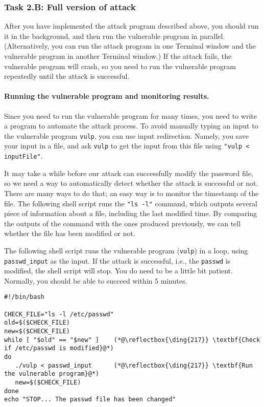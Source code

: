 \subsubsection{Task 2.B: Full version of attack}
After you have implemented the attack program described above, you
should run it in the background, and then run the vulnerable program in
parallel. (Alternatively, you can run the attack program in one Terminal
window and the vulnerable program in another Terminal window.)  If the
attack fails, the vulnerable program will crash, so you need to run the
vulnerable program repeatedly until the attack is successful. 



\paragraph{Running the vulnerable program and monitoring results.}
Since you need to run the vulnerable program for many
times, you need to write a program to automate the attack process. 
To avoid manually typing an input to the vulnerable program \texttt{vulp}, you can use 
input redirection. Namely, you save your input in a file, and ask
\texttt{vulp} to get the input from this file using \texttt{"vulp <
inputFile"}.

It may take a while before our attack can successfully modify the
password file, so we need a way to automatically detect whether the attack is
successful or not. There are many ways to do that; an easy way 
is to monitor the timestamp of the file.
The following shell script runs the \texttt{"ls -l"} command, which
outputs several piece of information about a
file, including the last modified time. By comparing the outputs of the
command with the ones produced previously, we can tell
whether the file has been modified or not. 


The following shell script runs the vulnerable program (\texttt{vulp}) in a loop,
using \texttt{passwd\_input} as the input. If the attack is successful, i.e.,
the \texttt{passwd} is modified, the shell script will stop. 
You do need to be a little bit patient. 
Normally, you should be able to succeed within 5 minutes. 



\begin{lstlisting}
#!/bin/bash

CHECK_FILE="ls -l /etc/passwd"
old=$($CHECK_FILE)
new=$($CHECK_FILE)
while [ "$old" == "$new" ]    (*@\reflectbox{\ding{217}} \textbf{Check if /etc/passwd is modified}@*)
do
   ./vulp < passwd_input      (*@\reflectbox{\ding{217}} \textbf{Run the vulnerable program}@*)
   new=$($CHECK_FILE)
done
echo "STOP... The passwd file has been changed"
\end{lstlisting}

